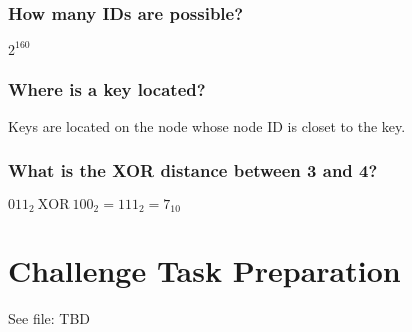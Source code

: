 \documentclass{article}
\begin{document}
\subsubsection{How many IDs are possible?}

$2^{160}$

\subsubsection{Where is a key located?}

Keys are located on the node whose node ID is closet to the key.

\subsubsection{What is the XOR distance between 3 and 4?}

${011}_2\ \text{XOR}\ {100}_2 = {111}_2 = 7_{10}$

\section{Challenge Task Preparation}

See file: TBD
\end{document}
